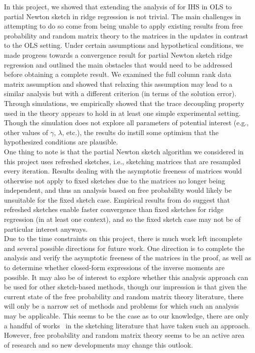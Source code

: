 In this project, we showed that extending the analysis of \citet{Lacotte:2020} for IHS in OLS to partial Newton sketch in ridge regression is not trivial. The main challenges in attempting to do so come from being unable to apply existing results from free probability and random matrix theory to the matrices in the updates in contrast to the OLS setting. Under certain assumptions and hypothetical conditions, we made progress towards a convergence result for partial Newton sketch ridge regression and outlined the main obstacles that would need to be addressed before obtaining a complete result. We examined the full column rank data matrix assumption and showed that relaxing this assumption may lead to a similar analysis but with a different criterion (in terms of the solution error). Through simulations, we empirically showed that the trace decoupling property used in the theory appears to hold in at least one simple experimental setting. Though the simulation does not explore all parameters of potential interest (e.g., other values of $\gamma$, $\lambda$, etc.), the results do instill some optimism that the hypothesized conditions are plausible.
\\

One thing to note is that the partial Newton sketch algorithm we considered in this project uses refreshed sketches, i.e., sketching matrices that are resampled every iteration. Results dealing with the asymptotic freeness of matrices would otherwise not apply to fixed sketches due to the matrices no longer being independent, and thus an analysis based on free probability would likely be unsuitable for the fixed sketch case. Empirical results from \citet{Chowdhury:2018} do suggest that refreshed sketches enable faster convergence than fixed sketches for ridge regression (in at least one context), and so the fixed sketch case may not be of particular interest anyways.
\\

Due to the time constraints on this project, there is much work left incomplete and several possible directions for future work. One direction is to complete the analysis and verify the asymptotic freeness of the matrices in the proof, as well as to determine whether closed-form expressions of the inverse moments are possible. It may also be of interest to explore whether this analysis approach can be used for other sketch-based methods, though our impression is that given the current state of the free probability and random matrix theory literature, there will only be a narrow set of methods and problems for which such an analysis may be applicable. This seems to be the case as to our knowledge, there are only a handful of works~\citep{Dobriban:2019,Lacotte:2020,Lacotte:2020b} in the sketching literature that have taken such an approach. However, free probability and random matrix theory seems to be an active area of research and so new developments may change this outlook.
